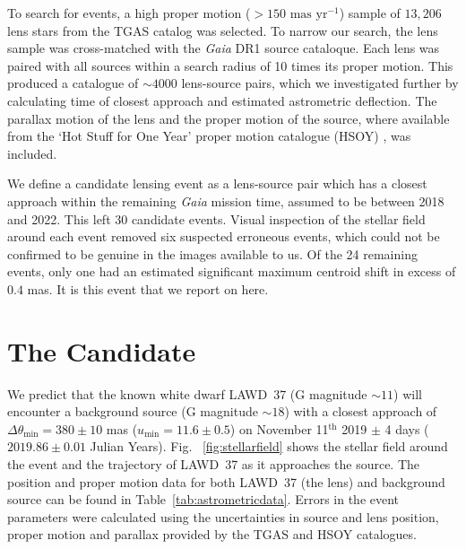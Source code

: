 \documentclass[fleqn,usenatbib]{mnras}
\newcommand{\Gaia}{{\it Gaia }}
\begin{document}
To search for events, a high proper motion ($> 150 \text{ mas yr}^{-1}$) sample of $13,206$ lens stars from the TGAS catalog was selected. To narrow our search, the lens sample was cross-matched with the \Gaia DR1 source cataloque. Each lens was paired with all sources within a search radius of 10 times its proper motion. This produced a catalogue of $\sim 4000$ lens-source pairs, which we investigated further by calculating time of closest approach and estimated astrometric deflection. The parallax motion of the lens and the proper motion of the source, where available from the `Hot Stuff for One Year' proper motion catalogue (HSOY) \citep{HSOY2017}, was included.


We define a candidate lensing event as a lens-source pair which has a closest approach within the remaining \Gaia mission time, assumed to be between 2018 and 2022. This left 30 candidate events. Visual inspection of the stellar field around each event removed six suspected erroneous events, which could not be confirmed to be genuine in the images available to us. Of the 24 remaining events, only one had an estimated significant maximum centroid shift in excess of $0.4$ mas. It is this event that we report on here.

\section{The Candidate}


We predict that the known white dwarf LAWD~37 (G magnitude $\sim11$) will encounter a background source (G magnitude $\sim18$) with a closest approach of $\Delta\theta_{\text{min}} = 380\pm10$ mas ($u_{\text{min}}=11.6\pm0.5$) on November 11$^{\text{th}}$ 2019 $\pm$ 4 days ($2019.86\pm0.01$ Julian Years). Fig. ~\ref{fig:stellarfield} shows the stellar field around the event and the trajectory of LAWD~37 as it approaches the source.  The position and proper motion data for both LAWD~37 (the lens) and background source can be found in Table~\ref{tab:astrometricdata}.  Errors in the event parameters were calculated using the uncertainties in source and lens position, proper motion and parallax provided by the TGAS and HSOY catalogues.
\end{document}
